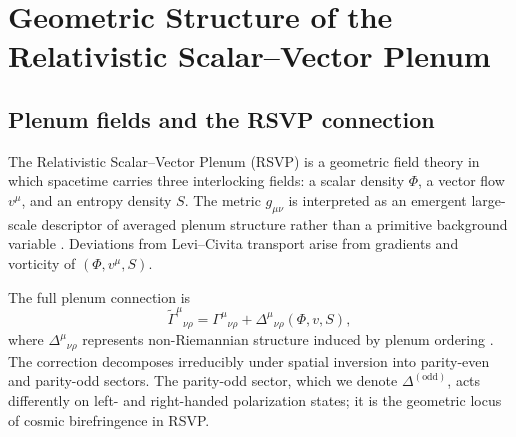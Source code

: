 \documentclass[12pt]{article}
\theoremstyle{definition}
\newcommand{\plenum}{\widetilde{\Gamma}}
\begin{document}
\section{Geometric Structure of the Relativistic Scalar--Vector Plenum}
\label{sec:geometry}

\subsection{Plenum fields and the RSVP connection}

The Relativistic Scalar--Vector Plenum (RSVP) is a geometric field theory
in which spacetime carries three interlocking fields: a scalar density
$\Phi$, a vector flow $v^\mu$, and an entropy density $S$.
The metric $g_{\mu\nu}$ is interpreted as an emergent large-scale descriptor
of averaged plenum structure rather than a primitive background variable
\cite{Jacobson1995,Verlinde2011,Padmanabhan2010}.
Deviations from Levi--Civita transport arise from gradients and vorticity of
$(\Phi,v^\mu,S)$.

The full plenum connection is
\begin{equation}
  \plenum^\mu{}_{\nu\rho}
  = \Gamma^\mu{}_{\nu\rho}
  + \Delta^\mu{}_{\nu\rho}(\Phi,v,S),
  \label{eq:plenum_connection}
\end{equation}
where $\Delta^\mu{}_{\nu\rho}$ represents non-Riemannian structure induced
by plenum ordering \cite{Cartan1922,Hehl1976}.
The correction decomposes irreducibly under spatial inversion into
parity-even and parity-odd sectors.
The parity-odd sector, which we denote $\Delta^{(\mathrm{odd})}$, acts
differently on left- and right-handed polarization states; it is the
geometric locus of cosmic birefringence in RSVP.
\end{document}
